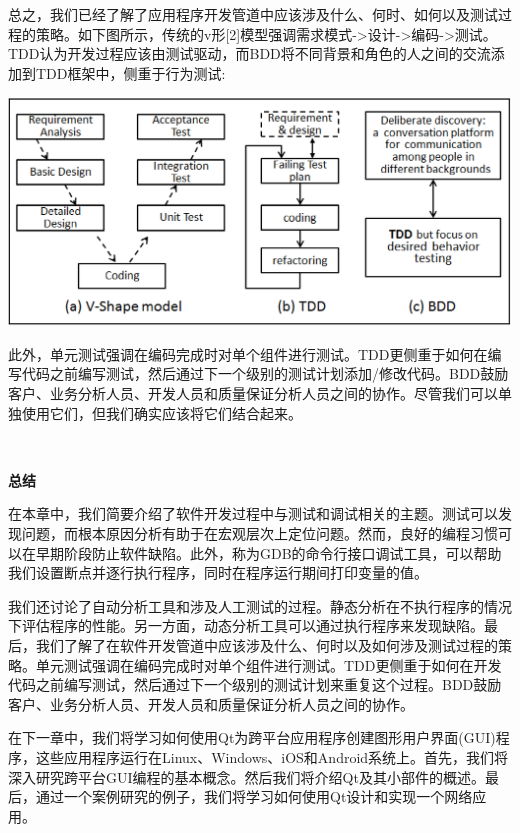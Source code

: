 总之，我们已经了解了应用程序开发管道中应该涉及什么、何时、如何以及测试过程的策略。如下图所示，传统的v形[2]模型强调需求模式->设计->编码->测试。TDD认为开发过程应该由测试驱动，而BDD将不同背景和角色的人之间的交流添加到TDD框架中，侧重于行为测试: \par

\begin{center}
	\includegraphics[width=1.0\textwidth]{content/Section-2/Chapter-13/3}
\end{center}

此外，单元测试强调在编码完成时对单个组件进行测试。TDD更侧重于如何在编写代码之前编写测试，然后通过下一个级别的测试计划添加/修改代码。BDD鼓励客户、业务分析人员、开发人员和质量保证分析人员之间的协作。尽管我们可以单独使用它们，但我们确实应该将它们结合起来。 \par

\noindent\textbf{}\ \par
\textbf{总结} \ \par
在本章中，我们简要介绍了软件开发过程中与测试和调试相关的主题。测试可以发现问题，而根本原因分析有助于在宏观层次上定位问题。然而，良好的编程习惯可以在早期阶段防止软件缺陷。此外，称为GDB的命令行接口调试工具，可以帮助我们设置断点并逐行执行程序，同时在程序运行期间打印变量的值。 \par
我们还讨论了自动分析工具和涉及人工测试的过程。静态分析在不执行程序的情况下评估程序的性能。另一方面，动态分析工具可以通过执行程序来发现缺陷。最后，我们了解了在软件开发管道中应该涉及什么、何时以及如何涉及测试过程的策略。单元测试强调在编码完成时对单个组件进行测试。TDD更侧重于如何在开发代码之前编写测试，然后通过下一个级别的测试计划来重复这个过程。BDD鼓励客户、业务分析人员、开发人员和质量保证分析人员之间的协作。 \par
在下一章中，我们将学习如何使用Qt为跨平台应用程序创建图形用户界面(GUI)程序，这些应用程序运行在Linux、Windows、iOS和Android系统上。首先，我们将深入研究跨平台GUI编程的基本概念。然后我们将介绍Qt及其小部件的概述。最后，通过一个案例研究的例子，我们将学习如何使用Qt设计和实现一个网络应用。 \par

